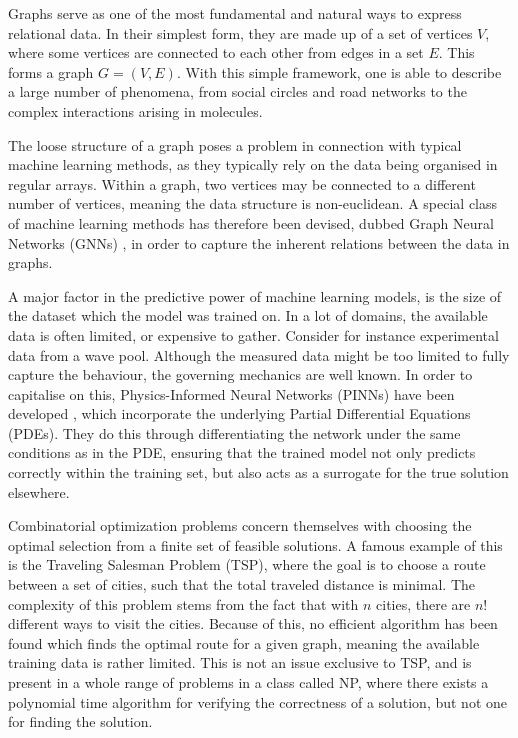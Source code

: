 Graphs serve as one of the most fundamental and natural ways to express relational data.
In their simplest form, they are made up of a set of vertices $V$, where some vertices are connected to each other from edges in a set $E$.
This forms a graph $G = (V, E)$.
With this simple framework, one is able to describe a large number of phenomena, from social circles and road networks to the complex interactions arising in molecules.

The loose structure of a graph poses a problem in connection with typical machine learning methods, as they typically rely on the data being organised in regular arrays.
Within a graph, two vertices may be connected to a different number of vertices, meaning the data structure is non-euclidean.
A special class of machine learning methods has therefore been devised, dubbed Graph Neural Networks (GNNs) \cite{GNN_survey}, in order to capture the inherent relations between the data in graphs.

A major factor in the predictive power of machine learning models, is the size of the dataset which the model was trained on.
In a lot of domains, the available data is often limited, or expensive to gather.
Consider for instance experimental data from a wave pool.
Although the measured data might be too limited to fully capture the behaviour, the governing mechanics are well known.
In order to capitalise on this, Physics-Informed Neural Networks (PINNs) have been developed \cite{PINNs}, which incorporate the underlying Partial Differential Equations (PDEs).
They do this through differentiating the network under the same conditions as in the PDE, ensuring that the trained model not only predicts correctly within the training set, but also acts as a surrogate for the true solution elsewhere.

Combinatorial optimization problems concern themselves with choosing the optimal selection from a finite set of feasible solutions.
A famous example of this is the Traveling Salesman Problem (TSP), where the goal is to choose a route between a set of cities, such that the total traveled distance is minimal.
The complexity of this problem stems from the fact that with $n$ cities, there are $n!$ different ways to visit the cities.
Because of this, no efficient algorithm has been found which finds the optimal route for a given graph, meaning the available training data is rather limited.
This is not an issue exclusive to TSP, and is present in a whole range of problems in a class called NP, where there exists a polynomial time algorithm for verifying the correctness of a solution, but not one for finding the solution.

